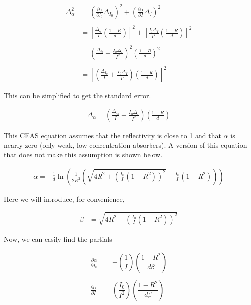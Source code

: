 \begin{align*}
  \Delta_\alpha^2 &= \left(\frac{\partial \alpha}{\partial I_0}\Delta_{I_0}\right)^2  + \left(\frac{\partial \alpha}{\partial I}\Delta_I\right)^2  \\\\
                  &= \left[\frac{\Delta_{I_0}}{I}\left(\frac{1-R}{d}\right)\right]^2 + \left[\frac{I_0 \Delta_I }{I^2}\left(\frac{1-R}{d}\right)\right]^2 \\\\
                  &= \left(\frac{\Delta_{I_0}}{I} + \frac{I_0\Delta_I}{I^2}\right)^2 \left(\frac{1-R}{d}\right)^2 \\\\
           &= \left[\left(\frac{\Delta_{I_0}}{I} + \frac{I_0\Delta_I}{I^2}\right) \left(\frac{1-R}{d}\right)\right]^2
\end{align*}

This can be simplified to get the standard error.

\begin{align}
  \Delta_\alpha = \left(\frac{\Delta_{I_0}}{I} + \frac{I_0\Delta_I}{I^2}\right) \left(\frac{1-R}{d}\right)\label{eq:err}
\end{align}

This CEAS equation assumes that the reflectivity is close to 1 and that
$\alpha$ is nearly zero (only weak, low concentration absorbers). A version
of this equation that does not make this assumption is shown below.

\begin{align}
  \alpha = -\frac{1}{d}\ln\left(\frac{1}{2R^2}\left(\sqrt{4R^2+\left(\frac{I_0}{I}(1-R^2)\right)^2} - \frac{I_0}{I}(1-R^2)\right)\right)\label{eq:ceas_full}
\end{align}

Here we will introduce, for convenience,

\begin{align*}
  \beta &= \sqrt{4R^2+\left(\frac{I_0}{I}(1-R^2)\right)^2}
\end{align*}

Now, we can easily find the partials

\begin{align*}
  \frac{\partial \alpha}{\partial I_0} &= - \left(\dfrac{1}{I}\right)\left(\dfrac{1-R^2}{d\beta}\right)\\\\
    \frac{\partial \alpha}{\partial I} &= \left(\dfrac{I_0}{I^2}\right)\left(\dfrac{1-R^2}{d\beta}\right)
\end{align*}

